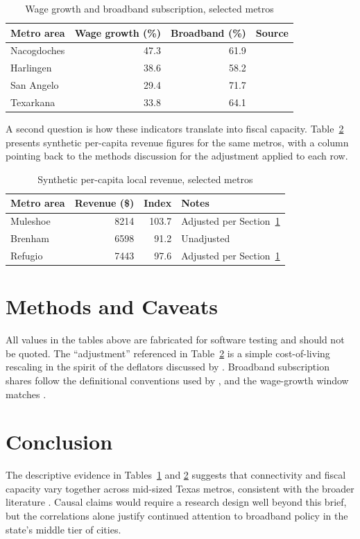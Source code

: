 \documentclass[11pt]{article}
\begin{document}
\begin{table}[ht]
\centering
\caption{Wage growth and broadband subscription, selected metros}
\label{tab:wages}
\begin{tabular}{lrrl}
\toprule
Metro area & Wage growth (\%) & Broadband (\%) & Source \\
\midrule
Nacogdoches      & 47.3 & 61.9 & \citep{delgado2023} \\
Harlingen        & 38.6 & 58.2 & \citep{okafor2024} \\
San Angelo       & 29.4 & 71.7 & \citep{hemphill2021} \\
Texarkana        & 33.8 & 64.1 & \citep{delgado2023} \\
\bottomrule
\end{tabular}
\end{table}

A second question is how these indicators translate into fiscal capacity.
Table~\ref{tab:fiscal} presents synthetic per-capita revenue figures for the
same metros, with a column pointing back to the methods discussion for the
adjustment applied to each row.

\begin{table}[ht]
\centering
\caption{Synthetic per-capita local revenue, selected metros}
\label{tab:fiscal}
\begin{tabular}{lrrl}
\toprule
Metro area & Revenue (\$) & Index & Notes \\
\midrule
Muleshoe        & 8214 & 103.7 & Adjusted per Section~\ref{sec:methods} \\
Brenham         & 6598 & 91.2  & Unadjusted \\
Refugio         & 7443 & 97.6  & Adjusted per Section~\ref{sec:methods} \\
\bottomrule
\end{tabular}
\end{table}

\section{Methods and Caveats}
\label{sec:methods}

All values in the tables above are fabricated for software testing and
should not be quoted. The ``adjustment'' referenced in
Table~\ref{tab:fiscal} is a simple cost-of-living rescaling in the spirit of
the deflators discussed by \citet{hemphill2021}. Broadband subscription
shares follow the definitional conventions used by \citet{okafor2024}, and
the wage-growth window matches \citet{delgado2023}.

\section{Conclusion}
\label{sec:conclusion}

The descriptive evidence in Tables~\ref{tab:wages} and \ref{tab:fiscal}
suggests that connectivity and fiscal capacity vary together across
mid-sized Texas metros, consistent with the broader literature
\citep{delgado2023,okafor2024,hemphill2021}. Causal claims would require a
research design well beyond this brief, but the correlations alone justify
continued attention to broadband policy in the state's middle tier of
cities.


\end{document}

